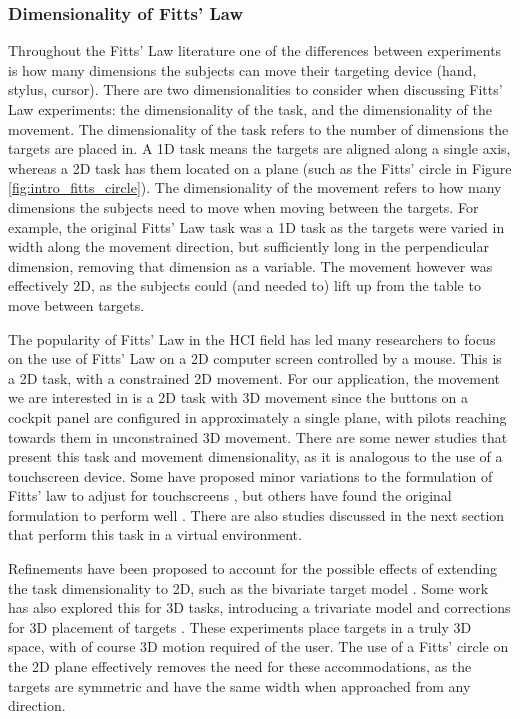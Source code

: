 \subsubsection{Dimensionality of Fitts' Law}\label{dimensionality-of-fitts-law}

Throughout the Fitts' Law literature one of the differences between experiments is how many dimensions the subjects can move their targeting device (hand, stylus, cursor).
There are two dimensionalities to consider when discussing Fitts' Law experiments: the dimensionality of the task, and the dimensionality of the movement.
The dimensionality of the task refers to the number of dimensions the targets are placed in.
A 1D task means the targets are aligned along a single axis, whereas a 2D task has them located on a plane (such as the Fitts' circle in Figure \ref{fig:intro_fitts_circle}).
The dimensionality of the movement refers to how many dimensions the subjects need to move when moving between the targets.
For example, the original Fitts' Law task was a 1D task as the targets were varied in width along the movement direction, but sufficiently long in the perpendicular dimension, removing that dimension as a variable.
The movement however was effectively 2D, as the subjects could (and needed to) lift up from the table to move between targets.

The popularity of Fitts' Law in the HCI field has led many researchers to focus on the use of Fitts' Law on a 2D computer screen controlled by a mouse.
This is a 2D task, with a constrained 2D movement.
For our application, the movement we are interested in is a 2D task with 3D movement since the buttons on a cockpit panel are configured in approximately a single plane, with pilots reaching towards them in unconstrained 3D movement.
There are some newer studies that present this task and movement dimensionality, as it is analogous to the use of a touchscreen device.
Some have proposed minor variations to the formulation of Fitts' law to adjust for touchscreens \citep{bi_ffitts_2013,sears_high_1991}, but others have found the original formulation to perform well \citep{mackenzie_fitts_2015}.
There are also studies discussed in the next section that perform this task in a virtual environment.

Refinements have been proposed to account for the possible effects of extending the task dimensionality to 2D, such as the bivariate target model \citep{accot_refining_2003, mackenzie_extending_1992, wobbrock_error_2008}.
Some work has also explored this for 3D tasks, introducing a trivariate model \citep{grossman_pointing_2004} and corrections for 3D placement of targets \citep{cha_extended_2013, murata_extending_2001}.
These experiments place targets in a truly 3D space, with of course 3D motion required of the user.
The use of a Fitts' circle on the 2D plane effectively removes the need for these accommodations, as the targets are symmetric and have the same width when approached from any direction.

